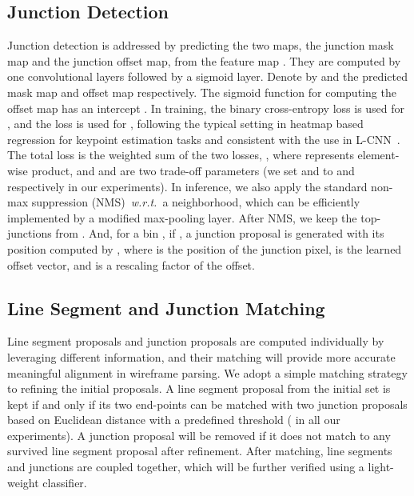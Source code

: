 \documentclass[10pt,twocolumn,letterpaper]{article}
\begin{document}
\subsection{Junction Detection}\label{sec:juncdet}
\vspace{-2mm}
Junction detection is addressed by predicting the two maps, the junction mask map and the junction offset map, from the feature map . They are computed by  one  convolutional layers followed by a sigmoid layer. Denote by  and  the predicted mask map and offset map respectively. The sigmoid function for computing the offset map has an intercept .
In training, the binary cross-entropy loss is used for , and the  loss  is used for , following the typical setting in heatmap based regression for keypoint estimation tasks and consistent with the use in L-CNN~\cite{ZhouQM19}. The total loss is the weighted sum of the two losses, , where  represents element-wise product, and  and  are two trade-off parameters (we set  and  to  and  respectively in our experiments). In inference, we also apply the standard non-max suppression (NMS)~\emph{w.r.t.}~a  neighborhood, which can be efficiently implemented by a modified max-pooling layer. After NMS, we keep the top- junctions from . 
And, for a bin , if , a junction proposal is generated with its position computed by , where  is the position of the junction pixel, 
 is the learned offset vector, and  is a rescaling factor of the offset.


\subsection{Line Segment and Junction Matching}\label{sec:matching}
\vspace{-2mm}
Line segment proposals and junction proposals are computed individually by leveraging different information, and their matching will provide more accurate meaningful alignment in wireframe parsing. We adopt a simple matching strategy to refining the initial proposals. A line segment proposal from the initial set is kept if and only if its two end-points can be matched with two junction proposals based on Euclidean distance with a predefined threshold  ( in all our experiments). A junction proposal will be removed if it does not match to any survived line segment proposal after refinement. After matching, line segments and junctions are coupled together, which will be further verified using a light-weight classifier.        
\end{document}

